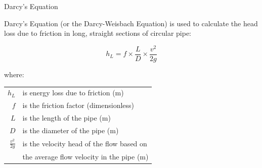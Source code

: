 \documentclass[9pt,xcolor={svgnames, x11names},professionalfonts]{beamer}
\begin{document}
\begin{frame}
\end{frame}

\begin{frame}{Darcy's Equation}
	\begin{cmini}[0.8]{
			Darcy's Equation (or the Darcy-Weisbach Equation) is used to calculate the head loss due to friction in long, straight
			sections of circular pipe:
		}
	\end{cmini}
	\vspace{-0.75cm}
	\begin{cmini}[0.5]{
			\par\medskip
			\begin{mybox}[title = Darcy's Equation]
				\[  h_L=f\times \frac{L}{D}\times \frac{v^2}{2g} \]
			\end{mybox}
			\parm
			where:
			\parm
			\begin{tabular}{rl}
				$h_L$             & is energy loss due to friction (m)        \\
				\addlinespace
				$f$               & is the friction factor (dimensionless)    \\
				\addlinespace
				$L$               & is the length of the pipe (m)             \\
				\addlinespace
				$D$               & is the diameter of the pipe (m)           \\
				\addlinespace
				$\tfrac{v^2}{2g}$ & is the velocity head of the flow based on \\&
				the average flow velocity in the pipe (m)\\
			\end{tabular}
		}
	\end{cmini}
	
\end{frame}
\end{document}
